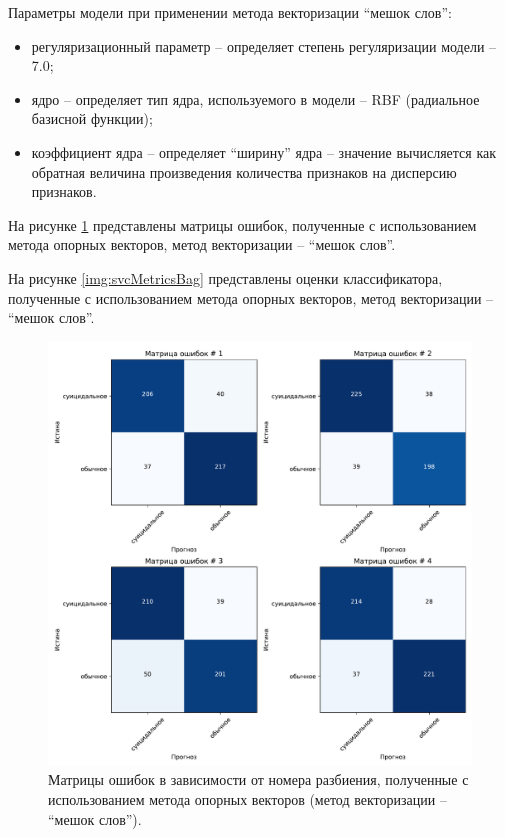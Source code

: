 Параметры модели при применении метода векторизации ``мешок слов'':
\begin{itemize}
	\item регуляризационный параметр -- определяет степень регуляризации модели -- 7.0;
	\item ядро -- определяет тип ядра, используемого в модели -- RBF (радиальное базисной функции);
	\item коэффициент ядра -- определяет ``ширину'' ядра -- значение вычисляется как обратная величина произведения количества признаков на дисперсию признаков.
\end{itemize}

На рисунке \ref{img:svcMatrBag} представлены матрицы ошибок, полученные с использованием метода опорных векторов, метод векторизации -- ``мешок слов''.

На рисунке \ref{img:svcMetricsBag} представлены оценки классификатора, полученные с использованием метода опорных векторов, метод векторизации -- ``мешок слов''.

\begin{figure}[H]
	\centering
	\includegraphics[width=\textwidth]{inc/plots/svcMatrBag.pdf}
	\caption{ Матрицы ошибок в зависимости от номера разбиения, полученные с использованием метода опорных векторов (метод векторизации -- ``мешок слов''). }
	\label{img:svcMatrBag}
\end{figure}

